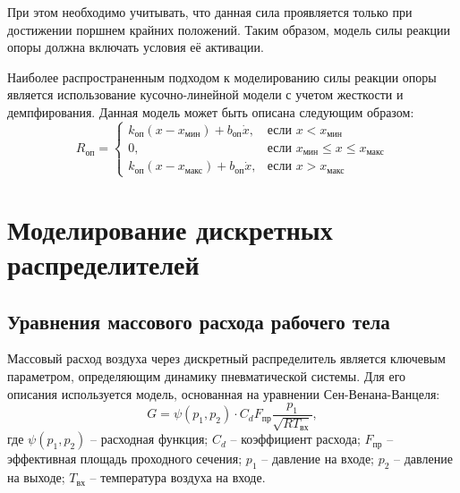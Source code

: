 При этом необходимо учитывать, что данная сила проявляется только при достижении
поршнем крайних положений. Таким образом, модель силы реакции опоры должна включать
условия её активации.

Наиболее распространенным подходом к моделированию силы реакции опоры является использование кусочно-линейной модели с учетом жесткости и демпфирования. Данная модель может быть описана следующим образом:
\begin{equation}\label{eq:ch2/support_reaction}
    R_\text{оп} = \begin{cases}
        k_\text{оп}(x - x_\text{мин}) + b_\text{оп}\dot{x},  & \text{если } x < x_\text{мин}                       \\
        0,                                                   & \text{если } x_\text{мин} \leq x \leq x_\text{макс} \\
        k_\text{оп}(x - x_\text{макс}) + b_\text{оп}\dot{x}, & \text{если } x > x_\text{макс}
    \end{cases}
\end{equation}

\section{Моделирование дискретных распределителей}\label{sec:ch2/sec3}

\subsection{Уравнения массового расхода рабочего тела}\label{sec:ch2/sec3/subsec1}
Массовый расход воздуха через дискретный распределитель
является ключевым параметром, определяющим динамику пневматической
системы. Для его описания используется модель, основанная на уравнении Сен-Венана-Ванцеля:
\begin{equation}
    G = \psi(p_1, p_2) \cdot C_d F_\text{пр} \frac{p_1}{\sqrt{RT_\text{вх}}},
\end{equation}
где
$\psi(p_1, p_2)$ -- расходная функция;
$C_d$ -- коэффициент расхода;
$F_\text{пр}$ -- эффективная площадь проходного сечения;
$p_1$ -- давление на входе;
$p_2$ -- давление на выходе;
$T_\text{вх}$ -- температура воздуха на входе.

